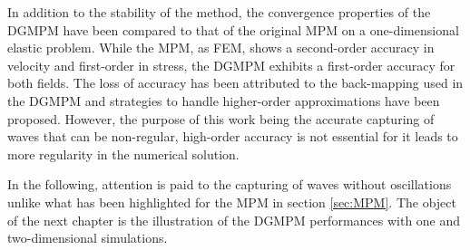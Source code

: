 In addition to the stability of the method, the convergence properties of the DGMPM have been compared to that of the original MPM on a one-dimensional elastic problem. While the MPM, as FEM, shows a second-order accuracy in velocity and first-order in stress, the DGMPM exhibits a first-order accuracy for both fields. The loss of accuracy has been attributed to the back-mapping used in the DGMPM and strategies to handle higher-order approximations have been proposed. However, the purpose of this work being the accurate capturing of waves that can be non-regular, high-order accuracy is not essential for it leads to more regularity in the numerical solution.

In the following, attention is paid to the capturing of waves without oscillations unlike what has been highlighted for the MPM in section \ref{sec:MPM}. The object of the next chapter is the illustration of the DGMPM performances with one and two-dimensional simulations.




